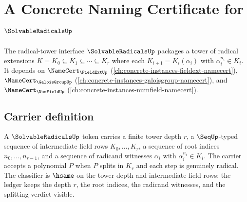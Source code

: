 \chapter{A Concrete Naming Certificate for $\SolvableRadicalsUp$}
\label{ch:concrete-instances-solvableradicals-namecert}

The radical-tower interface $\SolvableRadicalsUp$ packages a tower of radical extensions $K=K_0\subseteq K_1\subseteq\cdots\subseteq K_r$ where each $K_{i+1}=K_i(\alpha_i)$ with $\alpha_i^{n_i}\in K_i$. It depends on $\NameCert_{\FieldExtUp}$ (\autoref{ch:concrete-instances-fieldext-namecert}), $\NameCert_{\GaloisGroupUp}$ (\autoref{ch:concrete-instances-galoisgroup-namecert}), and $\NameCert_{\NumFieldUp}$ (\autoref{ch:concrete-instances-numfield-namecert}).

\section{Carrier definition}
\label{sec:solvableradicals-carrier}

A $\SolvableRadicalsUp$ token carries a finite tower depth $r$, a $\SeqUp$-typed sequence of intermediate field rows $K_0,\ldots,K_r$, a sequence of root indices $n_0,\ldots,n_{r-1}$, and a sequence of radicand witnesses $\alpha_i$ with $\alpha_i^{n_i}\in K_i$. The carrier accepts a polynomial $P$ when $P$ splits in $K_r$ and each step is genuinely radical. The classifier is $\hsame$ on the tower depth and intermediate-field rows; the ledger keeps the depth $r$, the root indices, the radicand witnesses, and the splitting verdict visible.

